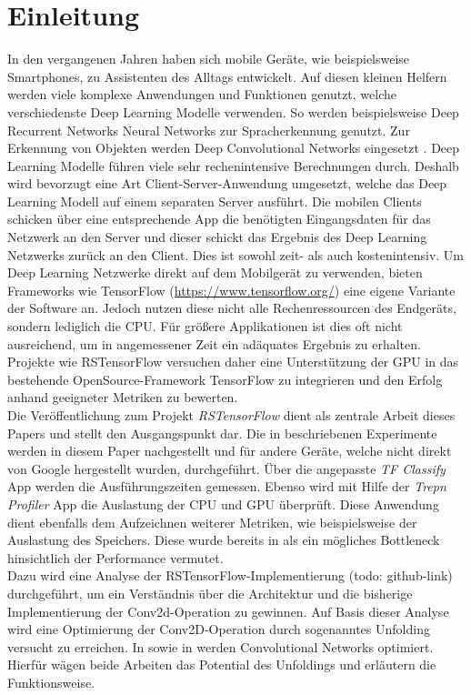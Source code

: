 \section{Einleitung}
\label{sec:einleitung}
In den vergangenen Jahren haben sich mobile Geräte, wie beispielsweise Smartphones, zu Assistenten des Alltags entwickelt. Auf diesen kleinen Helfern werden viele komplexe Anwendungen und Funktionen genutzt, welche verschiedenste Deep Learning Modelle verwenden. So werden beispielsweise Deep Recurrent Networks Neural Networks zur Spracherkennung \cite{bspSpracherkennung} genutzt. Zur Erkennung von Objekten werden Deep Convolutional Networks eingesetzt \cite{bspObjekterkennung}. Deep Learning Modelle führen viele sehr rechenintensive Berechnungen durch. Deshalb wird bevorzugt eine Art Client-Server-Anwendung umgesetzt, welche das Deep Learning Modell auf einem separaten Server ausführt. Die mobilen Clients schicken über eine entsprechende App die benötigten Eingangsdaten für das Netzwerk an den Server und dieser schickt das Ergebnis des Deep Learning Netzwerks zurück an den Client. Dies ist sowohl zeit- als auch kostenintensiv. Um Deep Learning Netzwerke direkt auf dem Mobilgerät zu verwenden, bieten Frameworks wie TensorFlow (\url{https://www.tensorflow.org/}) eine eigene Variante der Software an. Jedoch nutzen diese nicht alle Rechenressourcen des Endgeräts, sondern lediglich die CPU. Für größere Applikationen ist dies oft nicht ausreichend, um in angemessener Zeit ein adäquates Ergebnis zu erhalten. Projekte wie RSTensorFlow \cite{rstensorflow2017} versuchen daher eine Unterstützung der GPU in das bestehende OpenSource-Framework TensorFlow zu integrieren und den Erfolg anhand geeigneter Metriken zu bewerten. \\
Die Veröffentlichung zum Projekt \textit{RSTensorFlow} \cite{rstensorflow2017} dient als zentrale Arbeit dieses Papers und stellt den Ausgangspunkt dar. Die in \cite{rstensorflow2017} beschriebenen Experimente werden in diesem Paper nachgestellt und für andere Geräte, welche nicht direkt von Google hergestellt wurden, durchgeführt. Über die angepasste \textit{TF Classify} App werden die Ausführungszeiten gemessen. Ebenso wird mit Hilfe der \textit{Trepn Profiler} App die Auslastung der CPU und GPU überprüft. Diese Anwendung dient ebenfalls dem Aufzeichnen weiterer Metriken, wie beispielsweise der Auslastung des Speichers. Diese wurde bereits in \cite{rstensorflow2017} als ein mögliches Bottleneck hinsichtlich der Performance vermutet. 
\\ 
Dazu wird eine Analyse der RSTensorFlow-Implementierung (todo: github-link) durchgeführt, um ein Verständnis über die Architektur und die bisherige Implementierung der Conv2d-Operation zu gewinnen. Auf Basis dieser Analyse wird eine Optimierung der Conv2D-Operation durch sogenanntes Unfolding versucht zu erreichen. In \cite{conv2d-optimizing-unfolding} sowie in \cite{Rajbhandari:2017:OCM:3037697.3037745} werden Convolutional Networks optimiert. Hierfür wägen beide Arbeiten das Potential des Unfoldings und erläutern die Funktionsweise. 